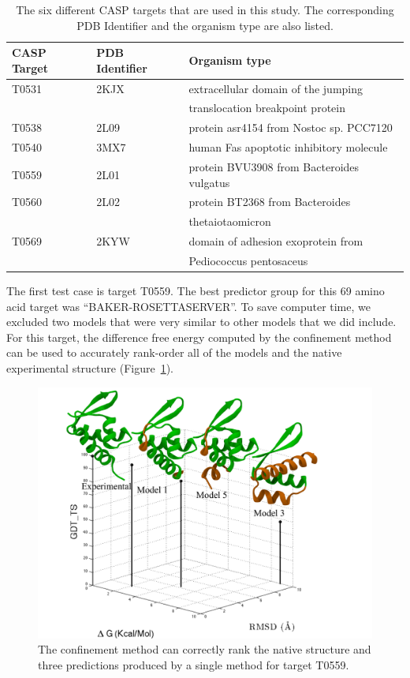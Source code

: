 \documentclass[12pt]{article}
\begin{document}
\begin{table}
\begin{center}
\caption{The six different CASP targets that are used in this study. The corresponding PDB Identifier and the 
         organism type are also listed.}
\label{table:casp_testcase}
\begin{tabular}{l l l}\hline
    CASP Target  & PDB Identifier &  Organism type  \\ \hline
     T0531       &    2KJX        &  extracellular domain of the jumping  \\
                 &                &  translocation breakpoint protein  \\ \hline
     T0538       &    2L09        &  protein asr4154 from Nostoc sp. PCC7120     \\ \hline
     T0540       &    3MX7        &  human Fas apoptotic inhibitory molecule     \\ \hline
     T0559       &    2L01        &  protein BVU3908 from Bacteroides vulgatus   \\ \hline
     T0560       &    2L02        &  protein BT2368 from Bacteroides  \\ 
                 &                &  thetaiotaomicron         \\ \hline
     T0569       &    2KYW        &  domain of adhesion exoprotein from \\ 
                 &                &   Pediococcus pentosaceus \\ \hline
\end{tabular}
\end{center}
\end{table}


The first test case is target T0559. The best predictor group for this 69 amino acid target was ``BAKER-ROSETTASERVER''.
To save computer time, we excluded two models that were very similar to other models that we did include. For this
target, the difference free energy computed by the confinement method can be used to accurately rank-order all of the
models and the native experimental structure (Figure~\ref{fig:T0559}).

\begin{figure}
    \begin{center}
        \includegraphics[width=3.8 in]{T0559.pdf}
    \end{center}
    \caption{The confinement method can correctly rank the native structure and three predictions produced by a single
        method for target T0559.}
\label{fig:T0559}
\end{figure}
\end{document}
